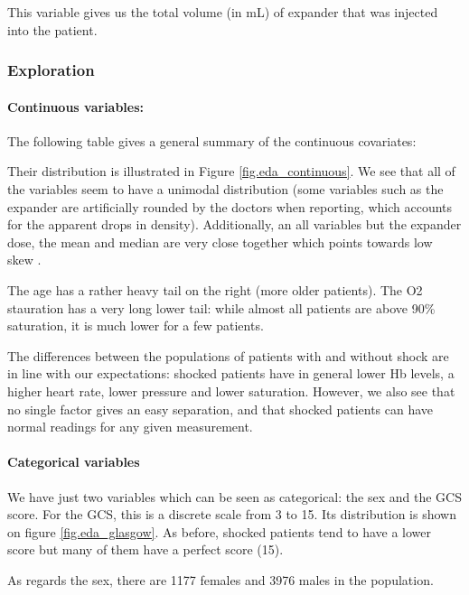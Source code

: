 This variable gives us the total volume (in mL) of expander that was injected into the patient.

			\subsubsection{Exploration}
\paragraph{Continuous variables:}
The following table gives a general summary of the continuous covariates:



Their distribution is illustrated in Figure \ref{fig.eda_continuous}. We see that all of the variables seem to have a unimodal distribution (some variables such as the expander are artificially rounded by the doctors when reporting, which accounts for the apparent drops in density). Additionally, an all variables but the expander dose, the mean and median are very close together which points towards low skew \cite{median_skew}. 

The age has a rather heavy tail on the right (more older patients). The O2 stauration has a very long lower tail: while almost all patients are above 90\% saturation, it is much lower for a few patients. 

The differences between the populations of patients with and without shock are in line with our expectations: shocked patients have in general lower Hb levels, a higher heart rate, lower pressure and lower saturation. However, we also see that no single factor gives an easy separation, and that shocked patients can have normal readings for any given measurement.



\paragraph{Categorical variables}
We have just two variables which can be seen as categorical: the sex and the GCS score. For the GCS, this is a discrete scale from 3 to 15. Its distribution is shown on figure \ref{fig.eda_glasgow}. As before, shocked patients tend to have a lower score but many of them have a perfect score (15). 

As regards the sex, there are 1177 females and 3976 males in the population.



